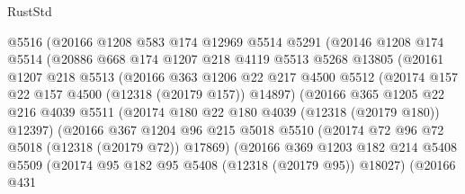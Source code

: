 \begin{lexlean}{RustStd}
\begin{coremodule}
                          @5516
                          (@20166
                            @1208
                            @583
                            @174
                            @12969
                            @5514
                            @5291
                            (@20146
                              @1208
                              @174
                              @5514
                              (@20886
                                @668
                                @174
                                @1207
                                @218
                                @4119
                                @5513
                                @5268
                                @13805
                                (@20161
                                  @1207
                                  @218
                                  @5513
                                  (@20166
                                    @363
                                    @1206
                                    @22
                                    @217
                                    @4500
                                    @5512
                                    (@20174 @157 @22 @157 @4500 (@12318 (@20179 @157)) @14897)
                                    (@20166
                                      @365
                                      @1205
                                      @22
                                      @216
                                      @4039
                                      @5511
                                      (@20174 @180 @22 @180 @4039 (@12318 (@20179 @180)) @12397)
                                      (@20166
                                        @367
                                        @1204
                                        @96
                                        @215
                                        @5018
                                        @5510
                                        (@20174 @72 @96 @72 @5018 (@12318 (@20179 @72)) @17869)
                                        (@20166
                                          @369
                                          @1203
                                          @182
                                          @214
                                          @5408
                                          @5509
                                          (@20174 @95 @182 @95 @5408 (@12318 (@20179 @95)) @18027)
                                          (@20166
                                            @431

\end{coremodule}
\end{lexlean}
